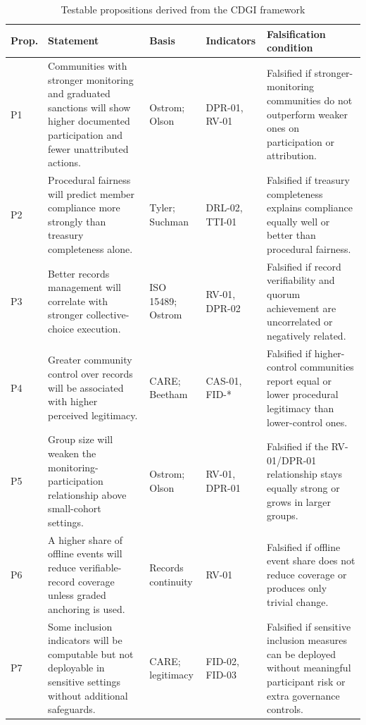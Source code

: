 \documentclass[sigconf,anonymous]{acmart}
\begin{document}
\begin{table}[t]
\caption{Testable propositions derived from the CDGI framework}
\label{tab:props}
\small
\begin{tabularx}{\textwidth}{>{\raggedright\arraybackslash}p{0.55cm} >{\raggedright\arraybackslash}p{4.8cm} >{\raggedright\arraybackslash}p{2.1cm} >{\raggedright\arraybackslash}p{1.7cm} Y}
\toprule
Prop. & Statement & Basis & Indicators & Falsification condition \\
\midrule
P1 & Communities with stronger monitoring and graduated sanctions will show higher documented participation and fewer unattributed actions. & Ostrom; Olson & DPR-01, RV-01 & Falsified if stronger-monitoring communities do not outperform weaker ones on participation or attribution. \\
P2 & Procedural fairness will predict member compliance more strongly than treasury completeness alone. & Tyler; Suchman & DRL-02, TTI-01 & Falsified if treasury completeness explains compliance equally well or better than procedural fairness. \\
P3 & Better records management will correlate with stronger collective-choice execution. & ISO 15489; Ostrom & RV-01, DPR-02 & Falsified if record verifiability and quorum achievement are uncorrelated or negatively related. \\
P4 & Greater community control over records will be associated with higher perceived legitimacy. & CARE; Beetham & CAS-01, FID-* & Falsified if higher-control communities report equal or lower procedural legitimacy than lower-control ones. \\
P5 & Group size will weaken the monitoring-participation relationship above small-cohort settings. & Ostrom; Olson & RV-01, DPR-01 & Falsified if the RV-01/DPR-01 relationship stays equally strong or grows in larger groups. \\
P6 & A higher share of offline events will reduce verifiable-record coverage unless graded anchoring is used. & Records continuity & RV-01 & Falsified if offline event share does not reduce coverage or produces only trivial change. \\
P7 & Some inclusion indicators will be computable but not deployable in sensitive settings without additional safeguards. & CARE; legitimacy & FID-02, FID-03 & Falsified if sensitive inclusion measures can be deployed without meaningful participant risk or extra governance controls. \\
\bottomrule
\end{tabularx}
\end{table}
\end{document}
